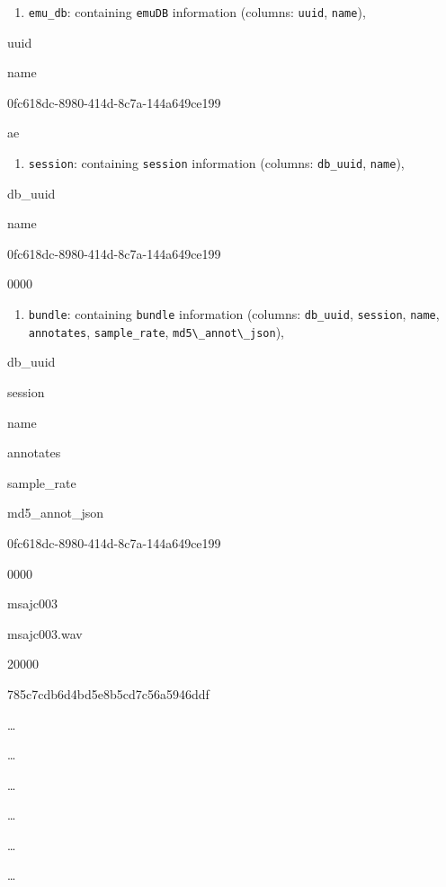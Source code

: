 \documentclass[]{book}
\providecommand{\tightlist}{%
  \setlength{\itemsep}{0pt}\setlength{\parskip}{0pt}}
\theoremstyle{definition}
\theoremstyle{definition}
\theoremstyle{definition}
\theoremstyle{remark}
\begin{document}
\begin{enumerate}
\def\labelenumi{\arabic{enumi}.}
\tightlist
\item
  \texttt{emu\_db}: containing \texttt{emuDB} information (columns:
  \texttt{uuid}, \texttt{name}),
\end{enumerate}

uuid

name

0fc618dc-8980-414d-8c7a-144a649ce199

ae

\begin{enumerate}
\def\labelenumi{\arabic{enumi}.}
\setcounter{enumi}{1}
\tightlist
\item
  \texttt{session}: containing \texttt{session} information (columns:
  \texttt{db\_uuid}, \texttt{name}),
\end{enumerate}

db\_uuid

name

0fc618dc-8980-414d-8c7a-144a649ce199

0000

\begin{enumerate}
\def\labelenumi{\arabic{enumi}.}
\setcounter{enumi}{2}
\tightlist
\item
  \texttt{bundle}: containing \texttt{bundle} information (columns:
  \texttt{db\_uuid}, \texttt{session}, \texttt{name},
  \texttt{annotates}, \texttt{sample\_rate},
  \texttt{md5\textbackslash{}\_annot\textbackslash{}\_json}),
\end{enumerate}

db\_uuid

session

name

annotates

sample\_rate

md5\_annot\_json

0fc618dc-8980-414d-8c7a-144a649ce199

0000

msajc003

msajc003.wav

20000

785c7cdb6d4bd5e8b5cd7c56a5946ddf

\ldots{}

\ldots{}

\ldots{}

\ldots{}

\ldots{}

\ldots{}
\end{document}
